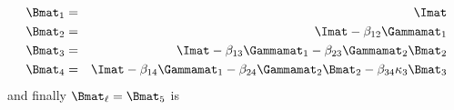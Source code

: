 \begin{eqnarray}
\Bmat_1 &=& \Imat \nonumber \\
\Bmat_2 &=& \Imat - \beta_{12} \Gammamat_{1} \nonumber\\
\Bmat_3 &=& \Imat - \beta_{13} \Gammamat_{1} - \beta_{23} \Gammamat_{2} \Bmat_2\\
\Bmat_4 &=& \Imat - \beta_{14} \Gammamat_1  - \beta_{24} \Gammamat_2 \Bmat_2 - \beta_{34} \kappa_3 \Bmat_3
\end{eqnarray}
and finally $\Bmat_\ell = \Bmat_5$ is